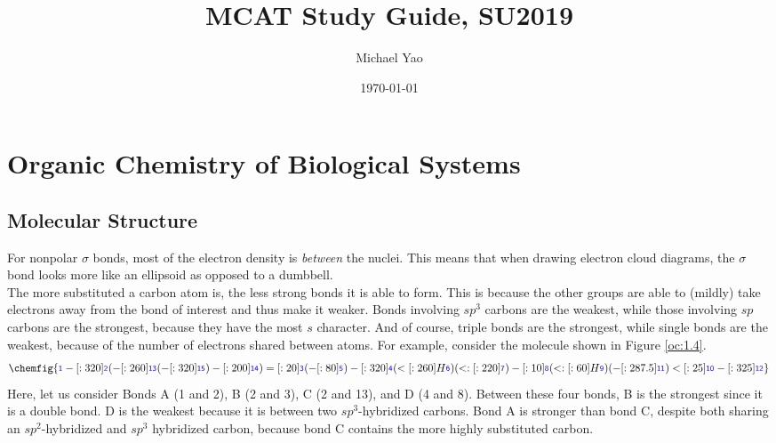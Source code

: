 \documentclass{article}
\title{\vspace{-6ex}MCAT Study Guide, SU2019}
\author{Michael Yao}
\date{\today\vspace{-4ex}}
\newcommand{\mcfatomno}[1]{\raisebox{2pt}{\color{blue}{\ensuremath{\mathsf{_{#1}}}}}}
\theoremstyle{plain}%
\theoremstyle{definition}
\theoremstyle{remark}
\begin{document}
\tableofcontents
\newpage

\section{Organic Chemistry of Biological Systems}
\subsection{Molecular Structure}
For nonpolar $\sigma$ bonds, most of the electron density is \textit{between} the nuclei. This means that when drawing electron cloud diagrams, the $\sigma$ bond looks more like an ellipsoid as opposed to a dumbbell.\\
\indent The more substituted a carbon atom is, the less strong bonds it is able to form. This is because the other groups are able to (mildly) take electrons away from the bond of interest and thus make it weaker. Bonds involving $sp^3$ carbons are the weakest, while those involving $sp$ carbons are the strongest, because they have the most $s$ character. And of course, triple bonds are the strongest, while single bonds are the weakest, because of the number of electrons shared between atoms. For example, consider the molecule shown in Figure \ref{oc:1.4}.
\begin{equation}
\begin{split}
\chemfig{
           \mcfatomno{1}%
    -[:320]\mcfatomno{2}%
              (
        -[:260]\mcfatomno{13}%
                  (
            -[:320]\mcfatomno{15}%
                  )
        -[:200]\mcfatomno{14}%
              )
     =[:20]\mcfatomno{3}%
              (
         -[:80]\mcfatomno{5}%
              )
    -[:320]\mcfatomno{4}%
              (
        <[:260]H\mcfatomno{6}%
              )
              (
       <:[:220]\mcfatomno{7}%
              )
     -[:10]\mcfatomno{8}%
              (
        <:[:60]H\mcfatomno{9}%
              )
              (
      -[:287.5]\mcfatomno{11}%
              )
     <[:25]\mcfatomno{10}%
    -[:325]\mcfatomno{12}%
}
\end{split} \label{oc:1.4}
\end{equation}
Here, let us consider Bonds A (1 and 2), B (2 and 3), C (2 and 13), and D (4 and 8). Between these four bonds, B is the strongest since it is a double bond. D is the weakest because it is between two $sp^3$-hybridized carbons. Bond A is stronger than bond C, despite both sharing an $sp^2$-hybridized and $sp^3$ hybridized carbon, because bond C contains the more highly substituted carbon.\\
\end{document}
